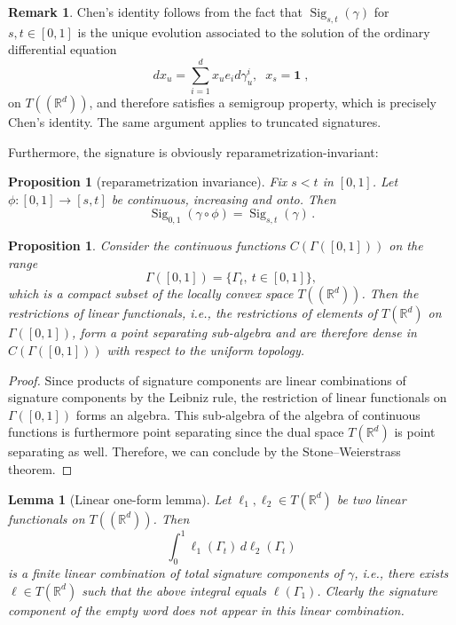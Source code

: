 \documentclass[11pt]{article}
\newtheorem{proposition}[theorem]{Proposition}
\newtheorem{lemma}[theorem]{Lemma}
\theoremstyle{definition}
\newtheorem{remark}[theorem]{Remark}
\newcommand{\R}{\mathbb{R}}
\newcommand{\Sig}{\operatorname{Sig}}
\newcommand{\id}{\mathbf{1}}
\begin{document}
\begin{remark}
Chen's identity follows from the fact that $\Sig_{s,t}(\gamma)$ for $ s, t \in [0,1]$ is the unique evolution associated to the solution of the ordinary differential equation
$$
d x_u = \sum_{i=1}^d x_u e_i d\gamma^i_u, \; \;   x_s = \id  \;,
$$
on $T((\mathbb{R}^d))$, and  therefore satisfies a semigroup property, which is precisely Chen's identity. The same argument applies to truncated signatures.
\end{remark}

Furthermore, the signature is obviously reparametrization-invariant:

\begin{proposition}[reparametrization invariance]\label{prop:reparam}
Fix $ s < t $ in $[0,1]$. Let $\phi:[0,1]\to[s,t]$ be continuous, increasing and onto. Then
\[
  \Sig_{0,1}(\gamma\circ\phi)=\Sig_{s,t}(\gamma) \, .
\]
\end{proposition}

\begin{proposition}\label{prop:SW}
Consider the continuous functions $C(\Gamma([0,1]))$ on the range 
\begin{equation}\label{eq:SigRange}
    \Gamma([0,1]) = \{\Gamma_t, \ t \in [0,1]\}, 
\end{equation}
which is a compact subset of the locally convex space $T((\R^d))$. Then the restrictions of linear functionals, i.e., the restrictions of elements of $T(\mathbb{R}^d)$ on $\Gamma([0,1])$,  form a point separating sub-algebra and are therefore dense in $C(\Gamma([0,1]))$ with respect to the uniform topology. 
\end{proposition}


\begin{proof}
Since products of signature components are linear combinations of signature components by the Leibniz rule, the restriction of linear functionals on $\Gamma([0,1])$ forms an algebra. This sub-algebra of the algebra of continuous functions is furthermore point separating since the dual space $T(\R^d)$ is point separating as well. Therefore, we can conclude by the Stone--Weierstrass theorem. 
\end{proof}

\begin{lemma}[Linear one-form lemma]\label{lem:polynomial-one-form}
Let $ \ell_1, \ell_2 \in T(\mathbb{R}^d) $ be two linear functionals on $T((\mathbb{R}^d))$. Then
\[
  \int_0^1 \ell_1(\Gamma_t)\,d \ell_2(\Gamma_t)
\]
is a finite linear combination of total signature components of $ \gamma $, i.e., there exists $ \ell \in T(\mathbb{R}^d)$ such that the above integral equals $\ell(\Gamma_1)$. Clearly the signature component of the empty word does not appear in this linear combination.
\end{lemma}
\end{document}
